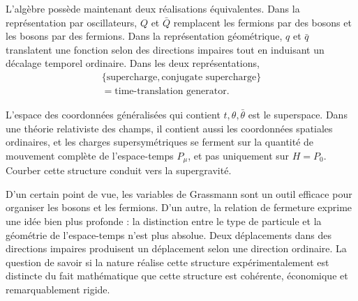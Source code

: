 L’algèbre possède maintenant deux réalisations équivalentes. Dans la représentation par oscillateurs, \(Q\) et \(\bar Q\) remplacent les fermions par des bosons et les bosons par des fermions. Dans la représentation géométrique, \(q\) et \(\bar q\) translatent une fonction selon des directions impaires tout en induisant un décalage temporel ordinaire. Dans les deux représentations,
\begin{equation}
\begin{gathered}
\{\text{supercharge},\text{conjugate supercharge}\}\\
=\text{time-translation generator}.
\end{gathered}
\end{equation}

L’espace des coordonnées généralisées qui contient \(t,\theta,\bar\theta\) est le superspace. Dans une théorie relativiste des champs, il contient aussi les coordonnées spatiales ordinaires, et les charges supersymétriques se ferment sur la quantité de mouvement complète de l’espace-temps \(P_\mu\), et pas uniquement sur \(H=P_0\). Courber cette structure conduit vers la supergravité.

D’un certain point de vue, les variables de Grassmann sont un outil efficace pour organiser les bosons et les fermions. D’un autre, la relation de fermeture exprime une idée bien plus profonde : la distinction entre le type de particule et la géométrie de l’espace-temps n’est plus absolue. Deux déplacements dans des directions impaires produisent un déplacement selon une direction ordinaire. La question de savoir si la nature réalise cette structure expérimentalement est distincte du fait mathématique que cette structure est cohérente, économique et remarquablement rigide.
